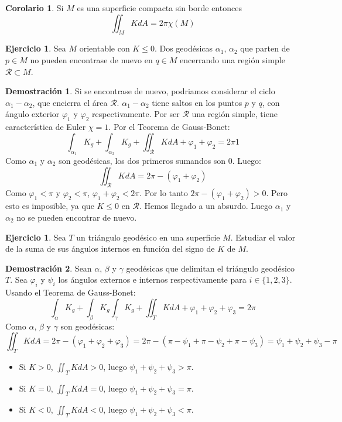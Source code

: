 \documentclass[twoside]{report}
\theoremstyle{definition}
\newtheorem{coro}[theorem]{Corolario}
\newtheorem{ejer}[theorem]{Ejercicio}
\newtheorem*{dem}{Demostración}
\numberwithin{equation}{section}
\begin{document}
\begin{coro}
Si $M$ es una superficie compacta sin borde entonces 
\[
\iint_M KdA=2\pi\chi(M)
\]
\end{coro}

\begin{ejer}
Sea $M$ orientable con $K ≤ 0$. Dos geodésicas $α_1$, $α_2$ que parten de $p \in M$ no pueden encontrase de nuevo en $q \in M$ encerrando una región simple $\mathcal{R} \subset M$.
\end{ejer}

\begin{dem} Si se encontrase de nuevo, podriamos considerar el ciclo $α_1-α_2$, que encierra el área $\mathcal{R}$. $α_1-α_2$ tiene saltos en los puntos $p$ y $q$, con ángulo exterior $φ_1$ y $φ_2$ respectivamente. Por ser $\mathcal{R}$ una región simple, tiene característica de Euler $χ=1$. Por el Teorema de Gauss-Bonet:
\[ \int_{α_1} K_g + \int_{α_2} K_g + \iint_\mathcal{R} K dA + φ_1 + φ_2 = 2 \pi 1 \]
Como $α_1$ y $α_2$ son geodésicas, los dos primeros sumandos son 0. Luego:
\[ \iint_\mathcal{R} K dA = 2\pi - (φ_1 + φ_2) \]
Como $φ_1 < \pi$ y $φ_2 < \pi$, $φ_1+φ_2 < 2\pi$. Por lo tanto $2\pi - (φ_1+φ_2) > 0$. Pero esto es imposible, ya que $K \leq 0$ en $\mathcal{R}$. Hemos llegado a un absurdo. Luego $α_1$ y $α_2$ no se pueden encontrar de nuevo.
\end{dem}

\begin{ejer} Sea $T$ un triángulo geodésico en una superficie $M$. Estudiar el valor de la suma de sus ángulos internos en función del signo de $K$ de $M$.
\end{ejer}

\begin{dem} Sean $α$, $β$ y $γ$ geodésicas que delimitan el triángulo geodésico $T$. Sea $φ_i$ y $ψ_i$ los ángulos externos e internos respectivamente para $i\in \{1,2,3\}$. Usando el Teorema de Gauss-Bonet:
\[ \int_α K_g + \int_β K_g  \int_γ K_g + \iint_T K dA + φ_1 + φ_2 + φ_3 = 2 \pi \]
Como $α$, $β$ y $γ$ son geodésicas:
\[ \iint_T K dA = 2\pi - (φ_1+φ_2+φ_3) = 2\pi - (π - ψ_1 + π - ψ_2 + π - ψ_3) = ψ_1 + ψ_2 + ψ_3 - π \]
\begin{itemize}
	\item Si $K > 0$, $\iint_T K dA > 0$, luego $ψ_1+ψ_2+ψ_3 > \pi$.
	\item Si $K = 0$, $\iint_T K dA = 0$, luego $ψ_1+ψ_2+ψ_3 = \pi$.
	\item Si $K < 0$, $\iint_T K dA < 0$, luego $ψ_1+ψ_2+ψ_3 < \pi$.
\end{itemize}
\end{dem}
\end{document}
